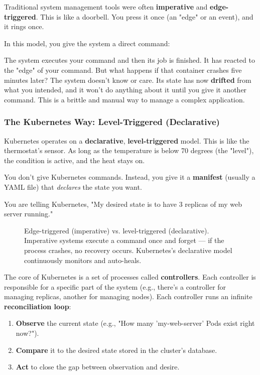Traditional system management tools were often \textbf{imperative} and \textbf{edge-triggered}. This is like a doorbell. You press it once (an "edge" or an event), and it rings once.

In this model, you give the system a direct command:

The system executes your command and then its job is finished. It has reacted to the "edge" of your command. But what happens if that container crashes five minutes later? The system doesn't know or care. Its state has now \textbf{drifted} from what you intended, and it won't do anything about it until you give it another command. This is a brittle and manual way to manage a complex application.

\subsubsection{\textbf{The Kubernetes Way: Level-Triggered (Declarative)}}


Kubernetes operates on a \textbf{declarative}, \textbf{level-triggered} model. This is like the thermostat's sensor. As long as the temperature is below 70 degrees (the "level"), the condition is active, and the heat stays on.

You don't give Kubernetes commands. Instead, you give it a \textbf{manifest} (usually a YAML file) that \textit{declares} the state you want.


You are telling Kubernetes, "My desired state is to have 3 replicas of my web server running."

\begin{figure}[htbp]
\centering

\caption{Edge-triggered (imperative) vs. level-triggered (declarative). Imperative systems execute a command once and forget --- if the process crashes, no recovery occurs. Kubernetes's declarative model continuously monitors and auto-heals.}
\label{fig:5_2}
\end{figure}


The core of Kubernetes is a set of processes called \textbf{controllers}. Each controller is responsible for a specific part of the system (e.g., there's a controller for managing replicas, another for managing nodes). Each controller runs an infinite \textbf{reconciliation loop}:

\begin{enumerate}
\item \textbf{Observe} the current state (e.g., "How many 'my-web-server' Pods exist right now?").
\item \textbf{Compare} it to the desired state stored in the cluster's database.
\item \textbf{Act} to close the gap between observation and desire.
\end{enumerate}

